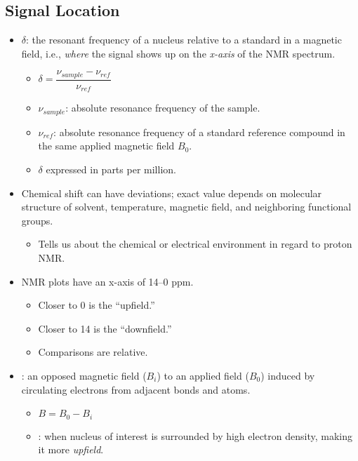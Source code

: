 \begin{itemize}
    \subsection{Signal Location}\label{Chemical Shifts}
    \begin{itemize}
        \item {} \(\delta \): the resonant frequency of a nucleus relative to a standard in a magnetic field, i.e., \emph{where} the signal shows up on the \emph{x-axis} of the NMR spectrum.
          \begin{itemize}
            \item \(\delta = \dfrac{\nu_{sample}-\nu_{ref}}{\nu_{ref}}\)
            \item \(\nu_{sample}\): absolute resonance frequency of the sample.
            \item \(\nu_{ref} \): absolute resonance frequency of a standard reference compound in the same applied magnetic field \(B_0\).
            \item \(\delta \) expressed in parts per million.
          \end{itemize}
        \item Chemical shift can have deviations; exact value depends on molecular structure of solvent, temperature, magnetic field, and neighboring functional groups.
          \begin{itemize}
            \item Tells us about the chemical or electrical environment in regard to proton NMR\@.
          \end{itemize}
        \item NMR plots have an x-axis of 14--0 ppm.
          \begin{itemize}
            \item Closer to 0 is the ``upfield.''
            \item Closer to 14 is the  ``downfield.''
            \item Comparisons are relative. 
          \end{itemize}
        \item {}: an opposed magnetic field (\(B_i\)) to an applied field (\(B_0\)) induced by circulating electrons from adjacent bonds and atoms. 
          \begin{itemize}
            \item \(B = B_0 - B_i\)
            \item {}: when nucleus of interest is surrounded by high electron density, making it more \emph{upfield}.

\end{itemize}
\end{itemize}
\end{itemize}

